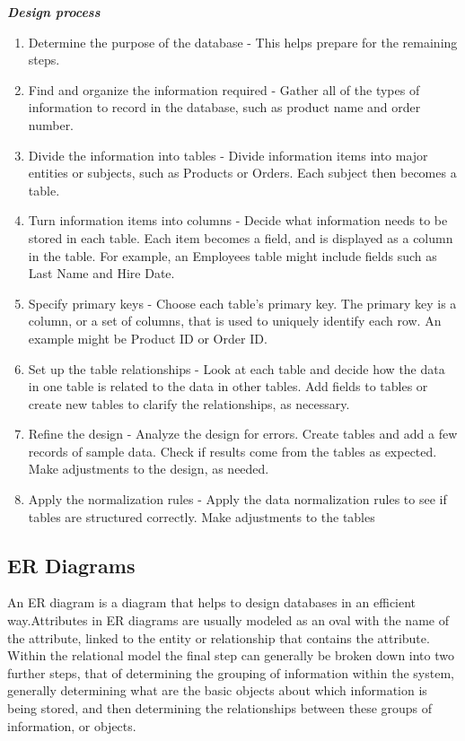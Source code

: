 \textbf{\emph{Design process}}
\begin{enumerate}

\item Determine the purpose of the database - This helps prepare for the remaining steps.
\item Find and organize the information required - Gather all of the types of information to record in the database, such as product name and order number.
\item Divide the information into tables - Divide information items into major entities or subjects, such as Products or Orders. Each subject then becomes a table.
\item Turn information items into columns - Decide what information needs to be stored in each table. Each item becomes a field, and is displayed as a column in the table. For example, an Employees table might include fields such as Last Name and Hire Date.
\item Specify primary keys - Choose each table’s primary key. The primary key is a column, or a set of columns, that is used to uniquely identify each row. An example might be Product ID or Order ID.
\item Set up the table relationships - Look at each table and decide how the data in one table is related to the data in other tables. Add fields to tables or create new tables to clarify the relationships, as necessary.
\item Refine the design - Analyze the design for errors. Create tables and add a few records of sample data. Check if results come from the tables as expected. Make adjustments to the design, as needed.
\item Apply the normalization rules - Apply the data normalization rules to see if tables are structured correctly. Make adjustments to the tables
\end{enumerate}

\subsection{ER Diagrams}
 An ER diagram is a diagram that helps to design databases in an efficient way.Attributes in ER diagrams are usually modeled as an oval with the name of the attribute, linked to the entity or relationship that contains the attribute.\\

Within the relational model the final step can generally be broken down into two further steps, that of determining the grouping of information within the system, generally determining what are the basic objects about which information is being stored, and then determining the relationships between these groups of information, or objects. \\

